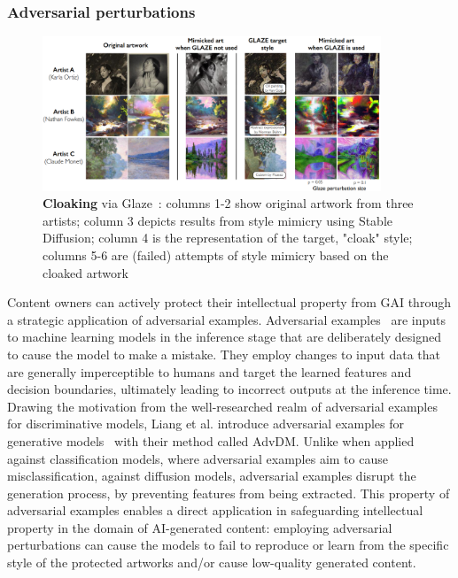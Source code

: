 \documentclass[conference,table]{IEEEtran} %
\begin{document}
\subsubsection{Adversarial perturbations}\label{sec:mitigation-adversarial} %
\begin{figure}[ht]
    \centering
    \includegraphics[width=0.9\textwidth]{figures/glaze.PNG}
    \caption{\textbf{Cloaking} via Glaze~\cite{shan_glaze_2023}: columns 1-2 show original artwork from three artists; column 3 depicts results from style mimicry using Stable Diffusion; column 4 is the representation of the target, "cloak" style; columns 5-6 are (failed) attempts of style mimicry based on the cloaked artwork}
    \label{fig:cloaking}
\end{figure}
Content owners can actively protect their intellectual property from GAI through a strategic application of adversarial examples. 
Adversarial examples~\cite{goodfellow_explaining_2015} are inputs to machine learning models in the inference stage that are deliberately designed to cause the model to make a mistake. 
They employ changes to input data that are generally imperceptible to humans and target the learned features and decision boundaries, ultimately leading to incorrect outputs at the inference time. 
Drawing the motivation from the well-researched realm of adversarial examples for discriminative models, %
Liang et al. introduce adversarial examples for generative models~\cite{liang_adversarial_2023} with their method called AdvDM.
Unlike when applied against classification models, where adversarial examples aim to cause misclassification, against diffusion models, adversarial examples disrupt the generation process, by preventing features from being extracted. 
This property of adversarial examples enables a direct application in safeguarding intellectual property in the domain of AI-generated content: employing adversarial perturbations can cause the models to fail to reproduce or learn from the specific style of the protected artworks and/or cause low-quality generated content. 
\end{document}
